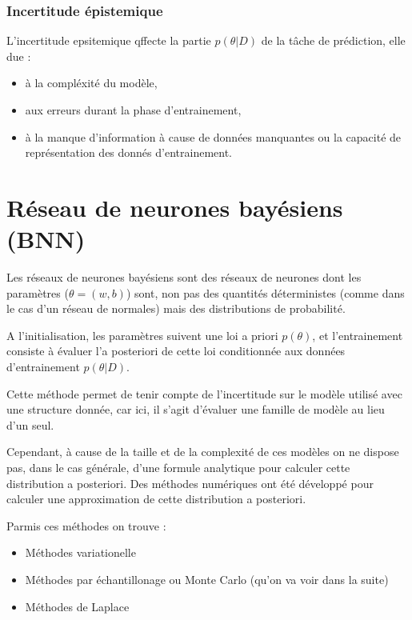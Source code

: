 \documentclass[french,12pt]{article}
\begin{document}
\subsubsection{Incertitude épistemique}

L'incertitude epsitemique qffecte la partie $p(\theta  | D)$ de la tâche de prédiction,
elle due :

\begin{itemize}
    \item à la compléxité du modèle,
    \item aux erreurs durant la phase d'entrainement,
    \item à la manque d'information à cause de données manquantes
          ou la capacité de représentation des donnés d'entrainement.
\end{itemize}

\pagebreak

\section{Réseau de neurones bayésiens (BNN)}


Les réseaux de neurones bayésiens sont des réseaux de neurones
dont les paramètres ($\theta = (w, b)$) sont, non pas des quantités déterministes (comme
dans le cas d'un réseau de normales) mais des distributions de probabilité.

A l'initialisation, les paramètres suivent une loi a priori $p(\theta)$,
et l'entrainement consiste à évaluer l'a posteriori de cette loi conditionnée
aux données d'entrainement $p(\theta | D)$.

Cette méthode permet de tenir compte de l'incertitude sur le modèle utilisé
avec une structure donnée, car ici, il s'agit d'évaluer 
une famille de modèle au lieu d'un seul.


Cependant, à cause de la taille et de la complexité de ces modèles
on ne dispose pas, dans le cas générale, d'une formule analytique pour 
calculer cette distribution a posteriori. Des méthodes numériques
ont été développé pour calculer une approximation de cette distribution a posteriori.

Parmis ces méthodes on trouve :
\begin{itemize}
    \item Méthodes variationelle
    \item Méthodes par échantillonage ou
          Monte Carlo (qu'on va voir dans la suite)
    \item Méthodes de Laplace
\end{itemize}
\end{document}
